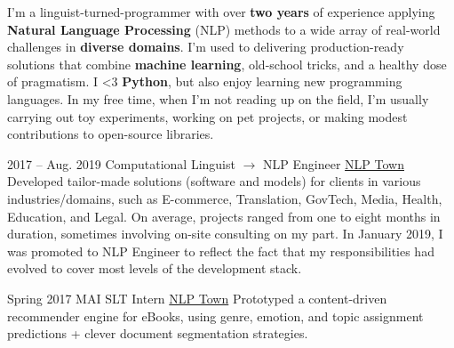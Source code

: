 \documentclass[9pt]{developercv} %
\begin{document}
\vspace{1em}

\begin{minipage}[]{\textwidth}
    \slashsep{}%
    \slashsep{}%
    \slashsep{}
    
    \vspace{-0.5em}
    \slashsep{} 
\end{minipage}


I'm a linguist-turned-programmer with over \textbf{two years} of experience
applying \textbf{Natural Language Processing} (NLP) methods to a wide
array of real-world challenges in \textbf{diverse domains}. I'm used to
delivering production-ready solutions that combine \textbf{machine learning},
old-school tricks, and a healthy dose of pragmatism. I <3 \textbf{Python}, but also
enjoy learning new programming languages. In my free time, when I'm
not reading up on the field, I'm usually carrying out toy experiments, 
working on pet projects, or making modest contributions to open-source
libraries.




\begin{entrylist}
	\entry
		{2017 -- Aug. 2019}
        {Computational Linguist $\longrightarrow$  NLP Engineer}
        {\href{http://nlp.town}{NLP Town}}
        {Developed tailor-made solutions (software and models) for clients in
         various industries/domains, such as E-commerce, Translation, GovTech, Media,
         Health, Education, and Legal. On average, projects ranged from one to eight 
         months in duration, sometimes involving on-site consulting on my part. In January
         2019, I was promoted to NLP Engineer to reflect the fact that my
         responsibilities had evolved to cover most levels of the development stack.}

	\entry
		{Spring 2017}
		{MAI SLT Intern}
        {\href{http://nlp.town}{NLP Town}}
        {Prototyped a content-driven recommender engine for eBooks, using genre,
         emotion, and topic assignment predictions + clever document segmentation
         strategies.}
\end{entrylist}
\end{document}
